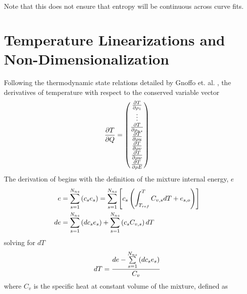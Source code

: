 Note that this does not ensure that entropy will be continuous across curve
fits.

\section{Temperature Linearizations and Non-Dimensionalization}
\label{temperature-jacobian-conditioning}

Following the thermodynamic state relations detailed by Gnoffo et. al.
\cite{gnoffo-tp}, the derivatives of temperature with respect to the conserved
variable vector
\begin{equation}
  \frac{\partial T}{\partial Q} =
  \begin{pmatrix}
    \frac{\partial T}{\partial \rho_1} \\
    \vdots \\
    \frac{\partial T}{\partial \rho_{ns}} \\
    \frac{\partial T}{\partial \rho u} \\
    \frac{\partial T}{\partial \rho v} \\
    \frac{\partial T}{\partial \rho w} \\
    \frac{\partial T}{\partial \rho E}
  \end{pmatrix}
  \label{tjac}
\end{equation}
The derivation of  begins with the definition of the mixture internal
energy, $e$
\begin{align}
  e &= \sum\limits_{s=1}^{N_{ns}} \left( c_s e_s \right) 
  = \sum\limits_{s=1}^{N_{ns}} \left[ c_s \left( \int_{T_{ref}}^{T} C_{v,s} dT + e_{s,o} \right)\right]
  \label{int-energy} \\
  de &= \sum\limits_{s=1}^{N_{ns}} \left( dc_s e_s \right) + \sum\limits_{s=1}^{N_{ns}} \left( c_s C_{v,s} \right) dT
  \label{dint-energy}
\end{align}
solving  for $dT$
\begin{equation}
  dT = \frac{de - \sum\limits_{s=1}^{N_{ns}} \left( dc_s e_s \right)}{C_v}
  \label{dt-de}
\end{equation}
where $C_v$ is the specific heat at constant volume of the mixture, defined as
